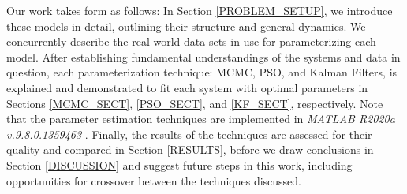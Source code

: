 \par Our work takes form as follows: In Section \ref{PROBLEM_SETUP}, we introduce these models in detail, outlining their structure and general dynamics. We concurrently describe the real-world data sets in use for parameterizing each model. After establishing fundamental understandings of the systems and data in question, each parameterization technique: MCMC, PSO, and Kalman Filters, is explained and demonstrated to fit each system with optimal parameters in Sections \ref{MCMC_SECT}, \ref{PSO_SECT}, and \ref{KF_SECT}, respectively. Note that the parameter estimation techniques are implemented in \textit{MATLAB R2020a v.9.8.0.1359463} \cite{MATLAB:2020b}.  Finally, the results of the techniques are assessed for their quality and compared in Section \ref{RESULTS}, before we draw conclusions in Section \ref{DISCUSSION} and suggest future steps in this work, including opportunities for crossover between the techniques discussed.